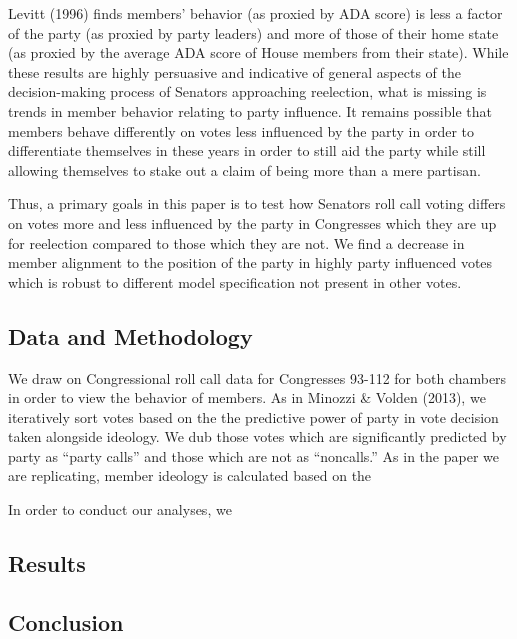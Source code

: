 \documentclass[12pt]{article}
\begin{document}
Levitt (1996) finds members' behavior (as proxied by ADA score) is less a factor of the party (as proxied by party leaders) and more of those of their home state (as proxied by the average ADA score of House members from their state). While these results are highly persuasive and indicative of general aspects of the decision-making process of Senators approaching reelection, what is missing is trends in member behavior relating to party influence. It remains possible that members behave differently on votes less influenced by the party in order to differentiate themselves in these years in order to still aid the party while still allowing themselves to stake out a claim of being more than a mere partisan.

Thus, a primary goals in this paper is to test how Senators roll call voting differs on votes more and less influenced by the party in Congresses which they are up for reelection compared to those which they are not. We find a decrease in member alignment to the position of the party in highly party influenced votes which is robust to different model specification not present in other votes.


\subsection{Data and Methodology}

We draw on Congressional roll call data for Congresses 93-112 for both chambers in order to view the behavior of members. As in Minozzi \& Volden (2013), we iteratively sort votes based on the the predictive power of party in vote decision taken alongside ideology. We dub those votes which are significantly predicted by party as ``party calls'' and those which are not as ``noncalls.'' As in the paper we are replicating, member ideology is calculated based on the 

In order to conduct our analyses, we 

\subsection{Results}

\subsection{Conclusion}
\end{document}
